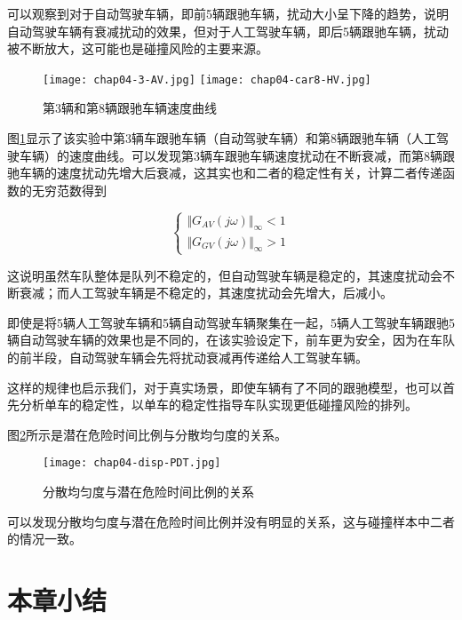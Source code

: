 可以观察到对于自动驾驶车辆，即前5辆跟驰车辆，扰动大小呈下降的趋势，说明自动驾驶车辆有衰减扰动的效果，但对于人工驾驶车辆，即后5辆跟驰车辆，扰动被不断放大，这可能也是碰撞风险的主要来源。

\begin{figure}
    \centering
      {\texttt{[image: chap04-3-AV.jpg]}}
      {\texttt{[image: chap04-car8-HV.jpg]}}
      \caption{第3辆和第8辆跟驰车辆速度曲线}
    \label{fig:chap04-11}
  \end{figure}

图\ref{fig:chap04-11}显示了该实验中第3辆车跟驰车辆（自动驾驶车辆）和第8辆跟驰车辆（人工驾驶车辆）的速度曲线。可以发现第3辆车跟驰车辆速度扰动在不断衰减，而第8辆跟驰车辆的速度扰动先增大后衰减，这其实也和二者的稳定性有关，计算二者传递函数的无穷范数得到

\begin{equation}
    \begin{cases}
      \Vert G_{AV}(j\omega) \Vert_{\infty} < 1 \\
      \Vert G_{GV}(j\omega) \Vert_{\infty} > 1
    \end{cases}
    \label{eq:chap04-10}
\end{equation}

这说明虽然车队整体是队列不稳定的，但自动驾驶车辆是稳定的，其速度扰动会不断衰减；而人工驾驶车辆是不稳定的，其速度扰动会先增大，后减小。

即使是将5辆人工驾驶车辆和5辆自动驾驶车辆聚集在一起，5辆人工驾驶车辆跟驰5辆自动驾驶车辆的效果也是不同的，在该实验设定下，前车更为安全，因为在车队的前半段，自动驾驶车辆会先将扰动衰减再传递给人工驾驶车辆。

这样的规律也启示我们，对于真实场景，即使车辆有了不同的跟驰模型，也可以首先分析单车的稳定性，以单车的稳定性指导车队实现更低碰撞风险的排列。

图\ref{fig:chap04-12}所示是潜在危险时间比例与分散均匀度的关系。

\begin{figure}
    \centering
    \texttt{[image: chap04-disp-PDT.jpg]}
    \caption{分散均匀度与潜在危险时间比例的关系}
    \label{fig:chap04-12}
\end{figure} 

可以发现分散均匀度与潜在危险时间比例并没有明显的关系，这与碰撞样本中二者的情况一致。

\section{本章小结}

